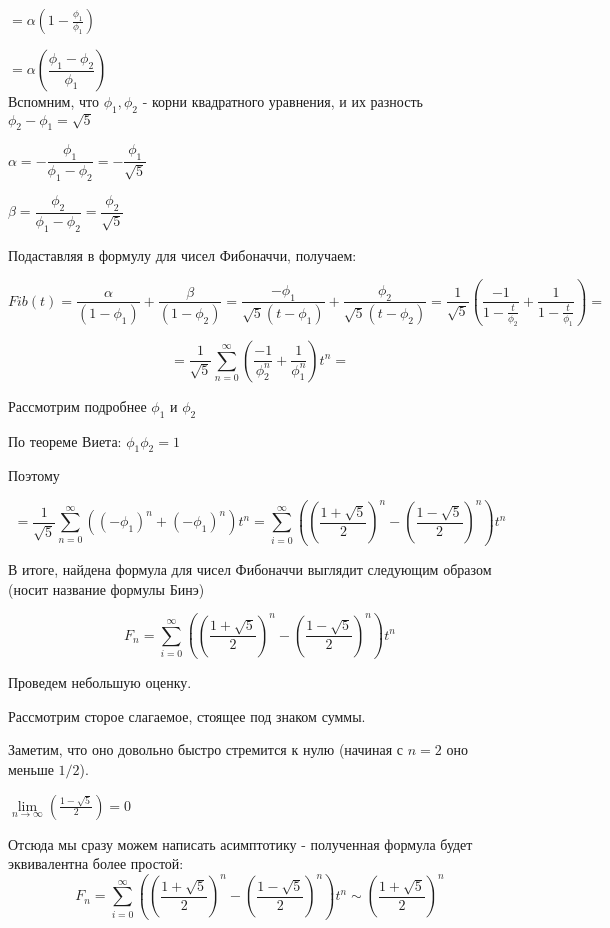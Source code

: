 $ = \alpha (1 - \frac{\phi_1}{\phi_1})  $

$ = \alpha \left( \dfrac{\phi_1 - \phi_2}{\phi_1}  \right)$ \\

Вспомним, что $ \phi_1, \phi_2 $ - корни квадратного уравнения, и их разность
$ \phi_2 - \phi_1 = \sqrt{5}$


$\alpha = - \dfrac{\phi_1}
{\phi_1 - \phi_2} 
=
- \dfrac{\phi_1}
{\sqrt{5}}
$

$\beta = 
\dfrac{\phi_2}
{\phi_1 - \phi_2} 
=
\dfrac{\phi_2}
{ \sqrt{5} } 
$ 


Подаставляя в формулу для чисел Фибоначчи, получаем:


$$
Fib(t) =
\dfrac{\alpha}{(1-\phi_1)}
+
\dfrac{\beta}{(1-\phi_2)} 
=
\dfrac{ - \phi_1}{\sqrt{5} (t-\phi_1)}  
+
\dfrac{\phi_2}{\sqrt{5} (t-\phi_2)} 
=
\dfrac{1}{\sqrt{5}} 
\left( 
\dfrac{-1}{1-\frac{t}{\phi_2} }
+
\dfrac{1}{1-\frac{t}{\phi_1} }
\right)=
$$

$$
 = \dfrac{1}{\sqrt{5}} \sum\limits_{n=0}^{\infty}
( \frac{-1}{\phi_2^n} + \frac{1}{\phi_1^n} ) t^{n}  =
$$

Рассмотрим подробнее $ \phi_1 $ и $ \phi_2 $

По теореме Виета:
$ \phi_1 \phi_2  = 1$

Поэтому 

$$
= \frac{1}{\sqrt{5}} \sum\limits_{n = 0}^{\infty} 
( (- \phi_1)^{n}  + ( -\phi_1)^{n}) t^n 
= 
\sum\limits_{i = 0}^{\infty}
\left(
(\frac{1 + \sqrt{5}}{2})^n - (\frac{1 - \sqrt{5}}{2})^n 
\right) t^n
$$

В итоге, найдена формула для чисел Фибоначчи выглядит следующим образом 
(носит название формулы Бинэ)

\begin{equation}
\label{bine}
F_n = \sum\limits_{i = 0}^{\infty}
\left(
(\frac{1 + \sqrt{5}}{2})^n - (\frac{1 - \sqrt{5}}{2})^n
\right) t^n
\end{equation}

Проведем небольшую оценку.

Рассмотрим сторое слагаемое, стоящее под знаком суммы.

Заметим, что оно довольно быстро стремится к нулю (начиная с $ n = 2 $ оно меньше $ 1/2 $).

$\lim\limits_{n \to \infty} (\frac{1 - \sqrt{5}}{2}) = 0$

Отсюда мы сразу можем написать асимптотику - 
полученная формула будет эквивалентна более простой:
$$
F_n = \sum\limits_{i = 0}^{\infty}
\left(
(\frac{1 + \sqrt{5}}{2})^n - (\frac{1 - \sqrt{5}}{2})^n
\right) t^n
\sim
\left(
\frac{1 + \sqrt{5}}{2}
\right) ^ n
$$


